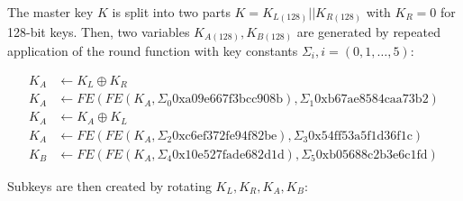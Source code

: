 The master key $K$ is split into two parts $K=K_{L(128)}||K_{R(128)}$ with
$K_R=0$ for 128-bit keys. Then, two variables $K_{A(128)},K_{B(128)}$ are
generated by repeated application of the round function with key constants
$\Sigma_i,i=(0,1,\dots,5)$:

\begin{align*}
    K_A&\leftarrow K_L\oplus K_R \\
    K_A&\leftarrow FE(FE(K_A, \Sigma_0\mathrm{0xa09e667f3bcc908b}), \Sigma_1\mathrm{0xb67ae8584caa73b2}) \\
    K_A&\leftarrow K_A\oplus K_L \\
    K_A&\leftarrow FE(FE(K_A, \Sigma_2\mathrm{0xc6ef372fe94f82be}), \Sigma_3\mathrm{0x54ff53a5f1d36f1c}) \\
    K_B&\leftarrow FE(FE(K_A, \Sigma_4\mathrm{0x10e527fade682d1d}), \Sigma_5\mathrm{0xb05688c2b3e6c1fd})
\end{align*}

Subkeys are then created by rotating $K_L,K_R,K_A,K_B$:

